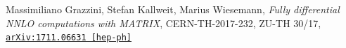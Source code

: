 \documentclass[12pt,a4paper,openright,twoside]{report}
\newcommand{\bibref}[4]{#1, \textit{#2}, #3 #4}
\begin{document}
\begin{thebibliography}{9}
	\bibref{Massimiliano Grazzini, Stefan Kallweit, Marius Wiesemann}{Fully differential NNLO computations with MATRIX}{CERN-TH-2017-232, ZU-TH 30/17,}{\href{https://arxiv.org/abs/1711.06631}{\texttt{arXiv:1711.06631 [hep-ph]}}}
%	
%	
%	
%	
	
\end{thebibliography}
\end{document}
